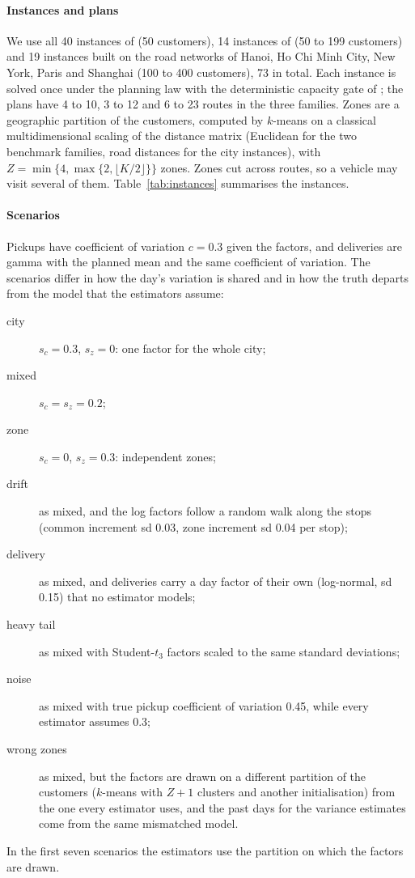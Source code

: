 \documentclass[preprint,authoryear,12pt]{elsarticle}
\begin{document}
\paragraph{Instances and plans} We use all 40 instances of
\citet{dethloff2001vehicle} (50 customers), 14 instances of
\citet{salhi1999cluster} (50 to 199 customers) and 19 instances built on
the road networks of Hanoi, Ho Chi Minh City, New York, Paris and
Shanghai (100 to 400 customers), 73 in total. Each instance is solved
once under the planning law with the deterministic capacity gate of
\citet{dang2026baton}; the plans have 4 to 10, 3 to 12 and 6 to 23
routes in the three families. Zones are a geographic partition of the
customers, computed by $k$-means on a classical multidimensional scaling
of the distance matrix (Euclidean for the two benchmark families, road
distances for the city instances), with $Z = \min\{4, \max\{2, \lfloor K/2
\rfloor\}\}$ zones. Zones cut across routes, so a vehicle may visit
several of them. Table~\ref{tab:instances} summarises the instances.

\begin{table}[t]
\centering\footnotesize
\caption{Instances and plans.}\label{tab:instances}
\resizebox{\textwidth}{!}{}
\end{table}

\paragraph{Scenarios} Pickups have coefficient of variation $c = 0.3$
given the factors, and deliveries are gamma with the planned mean and
the same coefficient of variation. The scenarios differ in how the day's
variation is shared and in how the truth departs from the model that
the estimators assume:
\begin{description}
\item[city] $s_c = 0.3$, $s_z = 0$: one factor for the whole city;
\item[mixed] $s_c = s_z = 0.2$;
\item[zone] $s_c = 0$, $s_z = 0.3$: independent zones;
\item[drift] as mixed, and the log factors follow a random walk along
  the stops (common increment sd 0.03, zone increment sd 0.04 per stop);
\item[delivery] as mixed, and deliveries carry a day factor of their own
  (log-normal, sd 0.15) that no estimator models;
\item[heavy tail] as mixed with Student-$t_3$ factors scaled to the same
  standard deviations;
\item[noise] as mixed with true pickup coefficient of variation 0.45,
  while every estimator assumes 0.3;
\item[wrong zones] as mixed, but the factors are drawn on a different
  partition of the customers ($k$-means with $Z+1$ clusters and another
  initialisation) from the one every estimator uses, and the past days
  for the variance estimates come from the same mismatched model.
\end{description}
In the first seven scenarios the estimators use the partition on which
the factors are drawn.
\end{document}
